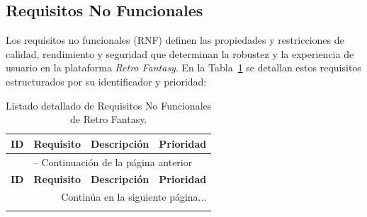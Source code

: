 \subsection{Requisitos No Funcionales}
Los requisitos no funcionales (RNF) definen las propiedades y restricciones de calidad, rendimiento y seguridad que determinan la robustez y la experiencia de usuario en la plataforma \textit{Retro Fantasy}. En la Tabla~\ref{tab:requisitos_no_funcionales} se detallan estos requisitos estructurados por su identificador y prioridad:

\begin{center}
\small
\begin{longtable}{|l|p{3.5cm}|p{7.5cm}|c|}
    \caption{Listado detallado de Requisitos No Funcionales de Retro Fantasy.}
    \label{tab:requisitos_no_funcionales} \\
    \hline
    \textbf{ID} & \textbf{Requisito} & \textbf{Descripción} & \textbf{Prioridad} \\
    \hline
    \endfirsthead

    \multicolumn{4}{c}{{\tablename\ \thetable{} -- Continuación de la página anterior}} \\
    \hline
    \textbf{ID} & \textbf{Requisito} & \textbf{Descripción} & \textbf{Prioridad} \\
    \hline
    \endhead

    \hline
    \multicolumn{4}{|r|}{{Continúa en la siguiente página...}} \\
    \hline
    \endfoot

    \hline
    \endlastfoot


\end{longtable}
\end{center}
